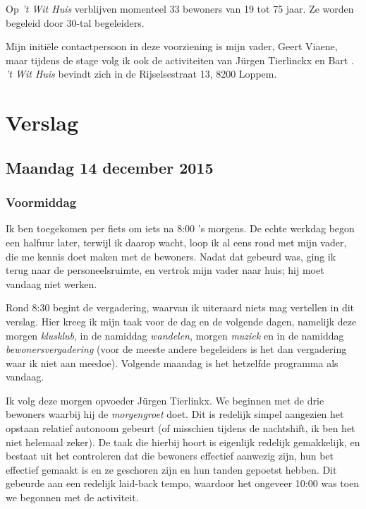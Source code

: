 \documentclass[a4paper,12pt]{article}
\begin{document}
Op \emph{'t Wit Huis} verblijven momenteel 33 bewoners van 19 tot 75 jaar. Ze worden begeleid door 30-tal begeleiders.

Mijn initiële contactpersoon in deze voorziening is mijn vader, Geert Viaene, maar tijdens de stage volg ik ook de activiteiten van Jürgen Tierlinckx en Bart%
. \emph{'t Wit Huis} bevindt zich in de Rijselsestraat 13, 8200 Loppem.

\section{Verslag}


\subsection{Maandag 14 december 2015}

\subsubsection{Voormiddag}

Ik ben toegekomen per fiets om iets na 8:00 's morgens. De echte werkdag begon een halfuur later, terwijl ik daarop wacht, loop ik al eens rond met mijn vader, die me kennis doet maken met de bewoners. Nadat dat gebeurd was, ging ik terug naar de personeelsruimte, en vertrok mijn vader naar huis; hij moet vandaag niet werken.

Rond 8:30 begint de vergadering, waarvan ik uiteraard niets mag vertellen in dit verslag. Hier kreeg ik mijn taak voor de dag en de volgende dagen, namelijk deze morgen \emph{klusklub}, in de namiddag \emph{wandelen}, morgen \emph{muziek} en in de namiddag \emph{bewonersvergadering} (voor de meeste andere begeleiders is het dan vergadering waar ik niet aan meedoe). Volgende maandag is het hetzelfde programma als vandaag.

Ik volg deze morgen opvoeder Jürgen Tierlinkx. We beginnen met de drie bewoners waarbij hij de \emph{morgengroet} doet. Dit is redelijk simpel aangezien het opstaan relatief autonoom gebeurt (of misschien tijdens de nachtshift, ik ben het niet helemaal zeker). De taak die hierbij hoort is eigenlijk redelijk gemakkelijk, en bestaat uit het controleren dat die bewoners effectief aanwezig zijn, hun bet effectief gemaakt is en ze geschoren zijn en hun tanden gepoetst hebben. Dit gebeurde aan een redelijk laid-back tempo, waardoor het ongeveer 10:00 was toen we begonnen met de activiteit.
\end{document}
